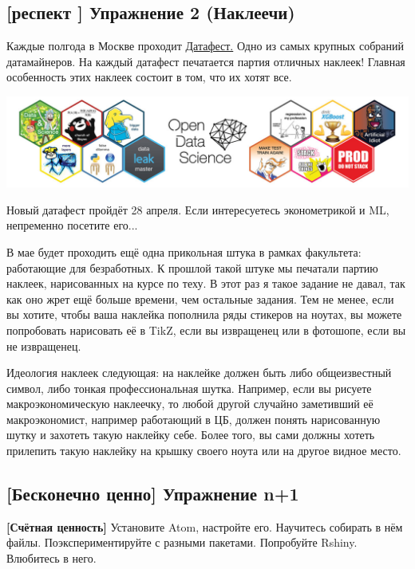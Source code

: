 \documentclass[12pt, a4paper, oneside]{article}
\begin{document}
\subsection*{[респект ]  Упражнение 2  (Наклеечи)}

Каждые полгода в Москве проходит \href{http://datafest.ru/}{Датафест.} Одно из самых крупных собраний датамайнеров. На каждый датафест печатается партия отличных наклеек! Главная особенность этих наклеек состоит в том, что их хотят все.

\begin{center}
	\includegraphics[scale=0.35]{DF.jpg}
\end{center}


Новый датафест пройдёт 28 апреля. Если интересуетесь эконометрикой и ML, непременно посетите его... 

В мае будет проходить ещё одна прикольная штука в рамках факультета: работающие для безработных. К прошлой такой штуке мы печатали партию наклеек, нарисованных на курсе по теху. В этот раз я такое задание не давал, так как оно жрет ещё больше времени, чем остальные задания. Тем не менее, если вы хотите, чтобы ваша наклейка пополнила ряды стикеров на ноутах, вы можете попробовать нарисовать её в TikZ, если вы извращенец или в фотошопе, если вы не извращенец. 

Идеология наклеек следующая: на наклейке должен быть либо общеизвестный символ, либо тонкая профессиональная шутка. Например, если вы рисуете макроэкономическую наклеечку, то любой другой случайно заметивший её макроэкономист, например работающий в ЦБ, должен понять нарисованную шутку и захотеть такую наклейку себе. Более того, вы сами должны хотеть прилепить такую наклейку на крышку своего ноута или на другое видное место.



\subsection*{[Бесконечно ценно] Упражнение n+1 }

\textbf{[Счётная ценность]}  Установите Atom, настройте его. Научитесь собирать в нём файлы. Поэкспериментируйте с разными пакетами. Попробуйте Rshiny. Влюбитесь в него.  
\end{document}
